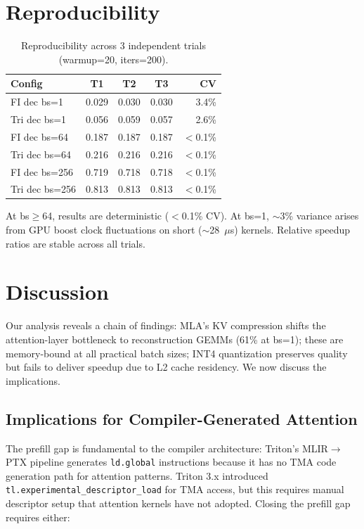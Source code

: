 \documentclass[10pt,twocolumn]{article}
\begin{document}
\section{Reproducibility}
\label{sec:repro}

\begin{table}[h]
\centering
\small
\caption{Reproducibility across 3 independent trials (warmup=20, iters=200).}
\label{tab:repro}
\begin{tabular}{@{}lcccr@{}}
\toprule
Config & T1 & T2 & T3 & CV \\
\midrule
FI dec bs=1   & 0.029 & 0.030 & 0.030 & 3.4\% \\
Tri dec bs=1  & 0.056 & 0.059 & 0.057 & 2.6\% \\
FI dec bs=64  & 0.187 & 0.187 & 0.187 & $<$0.1\% \\
Tri dec bs=64 & 0.216 & 0.216 & 0.216 & $<$0.1\% \\
FI dec bs=256 & 0.719 & 0.718 & 0.718 & $<$0.1\% \\
Tri dec bs=256& 0.813 & 0.813 & 0.813 & $<$0.1\% \\
\bottomrule
\end{tabular}
\end{table}

At bs$\geq$64, results are deterministic ($<$0.1\% CV).  At bs=1, $\sim$3\% variance arises from GPU boost clock fluctuations on short ($\sim$28~$\mu$s) kernels.  Relative speedup ratios are stable across all trials.

\section{Discussion}

Our analysis reveals a chain of findings: MLA's KV compression shifts the attention-layer bottleneck to reconstruction GEMMs (61\% at bs=1); these are memory-bound at all practical batch sizes; INT4 quantization preserves quality but fails to deliver speedup due to L2 cache residency.  We now discuss the implications.

\subsection{Implications for Compiler-Generated Attention}

The prefill gap is fundamental to the compiler architecture: Triton's MLIR$\to$PTX pipeline generates \texttt{ld.global} instructions because it has no TMA code generation path for attention patterns.  Triton 3.x introduced \texttt{tl.experimental\_descriptor\_load} for TMA access, but this requires manual descriptor setup that attention kernels have not adopted.  Closing the prefill gap requires either:
\end{document}
